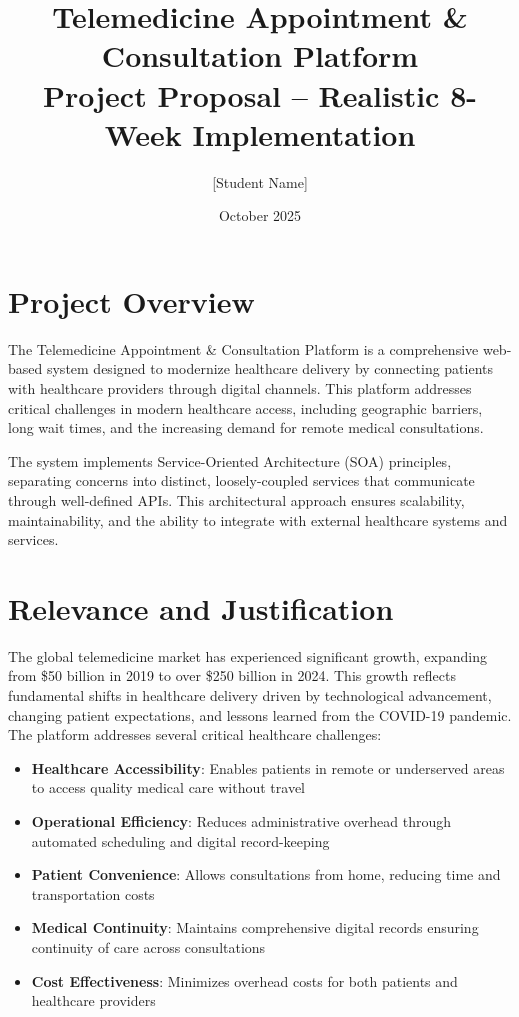 \documentclass[11pt,a4paper]{article}
\title{\textbf{Telemedicine Appointment \& Consultation Platform\\[0.3em]\large Project Proposal -- Realistic 8-Week Implementation}}
\author{[Student Name]}
\date{October 2025}
\begin{document}
\maketitle

\section{Project Overview}

The Telemedicine Appointment \& Consultation Platform is a comprehensive web-based system designed to modernize healthcare delivery by connecting patients with healthcare providers through digital channels. This platform addresses critical challenges in modern healthcare access, including geographic barriers, long wait times, and the increasing demand for remote medical consultations.

The system implements Service-Oriented Architecture (SOA) principles, separating concerns into distinct, loosely-coupled services that communicate through well-defined APIs. This architectural approach ensures scalability, maintainability, and the ability to integrate with external healthcare systems and services.

\section{Relevance and Justification}

The global telemedicine market has experienced significant growth, expanding from \$50 billion in 2019 to over \$250 billion in 2024. This growth reflects fundamental shifts in healthcare delivery driven by technological advancement, changing patient expectations, and lessons learned from the COVID-19 pandemic. The platform addresses several critical healthcare challenges:

\begin{itemize}[leftmargin=*, itemsep=0.2em]
    \item \textbf{Healthcare Accessibility}: Enables patients in remote or underserved areas to access quality medical care without travel
    \item \textbf{Operational Efficiency}: Reduces administrative overhead through automated scheduling and digital record-keeping
    \item \textbf{Patient Convenience}: Allows consultations from home, reducing time and transportation costs
    \item \textbf{Medical Continuity}: Maintains comprehensive digital records ensuring continuity of care across consultations
    \item \textbf{Cost Effectiveness}: Minimizes overhead costs for both patients and healthcare providers
\end{itemize}
\end{document}
